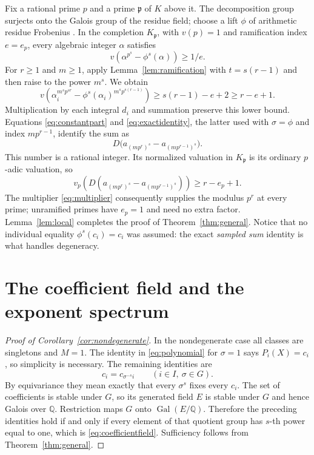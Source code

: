 \documentclass[11pt]{article}
\theoremstyle{definition}
\theoremstyle{remark}
\newcommand{\Q}{\mathbb Q}
\newcommand{\Gal}{\operatorname{Gal}}
\begin{document}
Fix a rational prime $p$ and a prime $\mathfrak p$ of $K$ above it. The decomposition group surjects onto the Galois group of the residue field; choose a lift $\phi$ of arithmetic residue Frobenius \cite[Section~8]{Milne}. In the completion $K_{\mathfrak p}$, with $v(p)=1$ and ramification index $e=e_p$, every algebraic integer $\alpha$ satisfies
\[
 v(\alpha^{p^s}-\phi^s(\alpha))\geq1/e.
\]
For $r\geq1$ and $m\geq1$, apply Lemma~\ref{lem:ramification} with $t=s(r-1)$ and then raise to the power $m^s$. We obtain
\begin{equation}\label{eq:localroots}
 v\left(\alpha_i^{m^s p^{sr}}
 -\phi^s(\alpha_i)^{m^s p^{s(r-1)}}\right)
 \geq s(r-1)-e+2\geq r-e+1.
\end{equation}
Multiplication by each integral $d_i$ and summation preserve this lower bound. Equations \eqref{eq:constantpart} and \eqref{eq:exactidentity}, the latter used with $\sigma=\phi$ and index $mp^{r-1}$, identify the sum as
\[
 D\bigl(a_{(mp^r)^s}-a_{(mp^{r-1})^s}\bigr).
\]
This number is a rational integer. Its normalized valuation in $K_{\mathfrak p}$ is its ordinary $p$-adic valuation, so
\[
 v_p\left(D(a_{(mp^r)^s}-a_{(mp^{r-1})^s})\right)\geq r-e_p+1.
\]
The multiplier \eqref{eq:multiplier} consequently supplies the modulus $p^r$ at every prime; unramified primes have $e_p=1$ and need no extra factor. Lemma~\ref{lem:local} completes the proof of Theorem~\ref{thm:general}. Notice that no individual equality $\phi^s(c_i)=c_i$ was assumed: the exact \emph{sampled sum} identity is what handles degeneracy.

\section{The coefficient field and the exponent spectrum}
\begin{proof}[Proof of Corollary~\ref{cor:nondegenerate}]
In the nondegenerate case all classes are singletons and $M=1$. The identity in \eqref{eq:polynomial} for $\sigma=1$ says $P_i(X)=c_i$, so simplicity is necessary. The remaining identities are
\[
 c_i=c_{\sigma^{-s}i}\qquad(i\in I,\ \sigma\in G).
\]
By equivariance they mean exactly that every $\sigma^s$ fixes every $c_i$. The set of coefficients is stable under $G$, so its generated field $E$ is stable under $G$ and hence Galois over $\Q$. Restriction maps $G$ onto $\Gal(E/\Q)$. Therefore the preceding identities hold if and only if every element of that quotient group has $s$-th power equal to one, which is \eqref{eq:coefficientfield}. Sufficiency follows from Theorem~\ref{thm:general}.
\end{proof}
\end{document}
